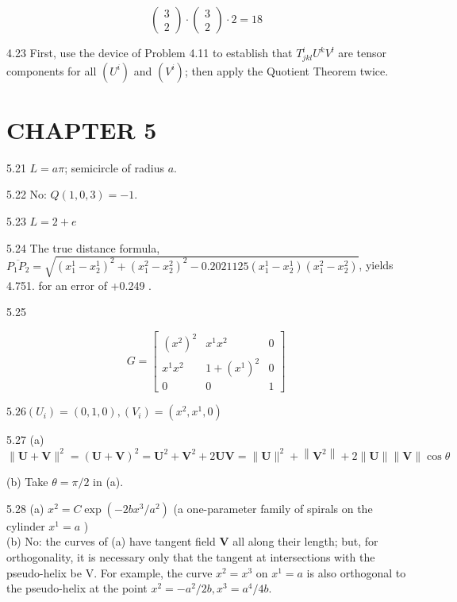 \documentclass[10pt]{article}
\begin{document}
$$
\left(\begin{array}{l}
3 \\
2
\end{array}\right) \cdot\left(\begin{array}{l}
3 \\
2
\end{array}\right) \cdot 2=18
$$

4.23 First, use the device of Problem 4.11 to establish that $T_{j k l}^{i} U^{k} V^{l}$ are tensor components for all $\left(U^{i}\right)$ and $\left(V^{i}\right)$; then apply the Quotient Theorem twice.

\section*{CHAPTER 5}
5.21 $L=a \pi$; semicircle of radius $a$.

5.22 No: $Q(1,0,3)=-1$.

5.23 $L=2+e$

5.24 The true distance formula, $\overline{P_{1} P_{2}}=\sqrt{\left(x_{1}^{1}-x_{2}^{1}\right)^{2}+\left(x_{1}^{2}-x_{2}^{2}\right)^{2}-0.2021125\left(x_{1}^{1}-x_{2}^{1}\right)\left(x_{1}^{2}-x_{2}^{2}\right)}$, yields 4.751. for an error of +0.249 .

5.25

$$
G=\left[\begin{array}{ccc}
\left(x^{2}\right)^{2} & x^{1} x^{2} & 0 \\
x^{1} x^{2} & 1+\left(x^{1}\right)^{2} & 0 \\
0 & 0 & 1
\end{array}\right]
$$

$5.26\left(U_{i}\right)=(0,1,0),\left(V_{i}\right)=\left(x^{2}, x^{1}, 0\right)$

5.27 (a) $\|\mathbf{U}+\mathbf{V}\|^{2}=(\mathbf{U}+\mathbf{V})^{2}=\mathbf{U}^{2}+\mathbf{V}^{2}+2 \mathbf{U V}=\|\mathbf{U}\|^{2}+\left\|\mathbf{V}^{2}\right\|+2\|\mathbf{U}\|\|\mathbf{V}\| \cos \theta$

(b) Take $\theta=\pi / 2$ in (a).

5.28 (a) $x^{2}=C \exp \left(-2 b x^{3} / a^{2}\right)$ (a one-parameter family of spirals on the cylinder $x^{1}=a$ )\\
(b) No: the curves of (a) have tangent field $\mathbf{V}$ all along their length; but, for orthogonality, it is necessary only that the tangent at intersections with the pseudo-helix be V. For example, the curve $x^{2}=x^{3}$ on $x^{1}=a$ is also orthogonal to the pseudo-helix at the point $x^{2}=-a^{2} / 2 b, x^{3}=a^{4} / 4 b$.
\end{document}
